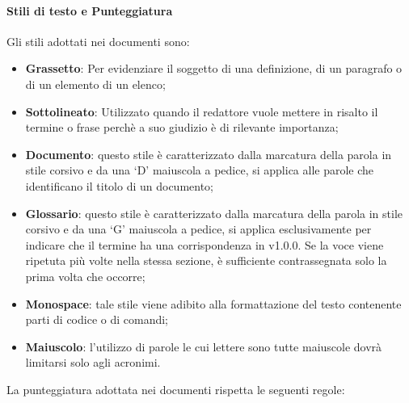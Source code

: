            \paragraph{Stili di testo e Punteggiatura}
                Gli stili adottati nei documenti sono: \\
                \begin{itemize}
                    \item\textbf{Grassetto}: Per evidenziare il soggetto di una definizione, di un paragrafo o di un elemento di un elenco;
                    \item\textbf{Sottolineato}: Utilizzato quando il redattore vuole mettere in risalto il termine o frase perchè a suo giudizio è di rilevante importanza;
                    \item\textbf{Documento}: questo stile è caratterizzato dalla marcatura della parola in stile corsivo e da una ‘D’ maiuscola a pedice, si applica alle parole che identificano il titolo di un documento;
                    \item\textbf{Glossario}: questo stile è caratterizzato dalla marcatura della parola in stile corsivo e da una ‘G’ maiuscola a pedice, si applica esclusivamente per indicare che il termine ha una corrispondenza in  v1.0.0. Se la voce viene ripetuta più volte nella stessa sezione, è sufficiente contrassegnata solo la prima volta che occorre;
                    \item\textbf{Monospace}: tale stile viene adibito alla formattazione del testo contenente parti di codice o di comandi;
                    \item\textbf{Maiuscolo}: l’utilizzo di parole le cui lettere sono tutte maiuscole dovrà limitarsi solo agli acronimi.
                \end{itemize}
                La punteggiatura adottata nei documenti rispetta le seguenti regole: \\
